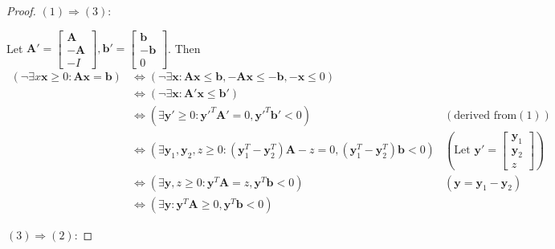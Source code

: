     \begin{proof}
        $(1)\Rightarrow(3)$:

        Let $\mathbf{A}'=\left[
        \begin{matrix}
            \mathbf{A} \\
            -\mathbf{A} \\
            -I
        \end{matrix}
        \right],
        \mathbf{b}'=\left[
        \begin{matrix}
            \mathbf{b} \\
            -\mathbf{b} \\
            0
        \end{matrix}
        \right]$.
        Then \begin{align*}
            (\neg \exists x\mathbf{x}\ge 0: \mathbf{A}\mathbf{x}= \mathbf{b})&\iff(\neg \exists \mathbf{x}: \mathbf{A}\mathbf{x}\le \mathbf{b},-\mathbf{A}\mathbf{x}\le-\mathbf{b},-\mathbf{x}\le 0)\\
                                        &\iff(\neg \exists \mathbf{x}: \mathbf{A}'\mathbf{x}\le \mathbf{b}') \\
                                        &\iff(\exists \mathbf{y}'\ge 0 :\mathbf{y}'^{T}\mathbf{A}'=0,\mathbf{y}'^{T}\mathbf{b}'<0) &(\text{derived from} (1))\\
                                        &\iff(\exists \mathbf{y}_1,\mathbf{y}_2,z\ge 0:(\mathbf{y}_{1}^{T}-\mathbf{y}_{2}^{T})\mathbf{A}-z=0,(\mathbf{y}_{1}^{T}-\mathbf{y}_{2}^{T})\mathbf{b}<0) &(\text{Let }\mathbf{y}'=\left[\begin{matrix} \mathbf{y}_1 \\\mathbf{y}_2 \\z \end{matrix}\right])\\
                                        &\iff(\exists \mathbf{y},z\ge 0:\mathbf{y}^{T}\mathbf{A}=z,\mathbf{y}^{T}\mathbf{b}<0) &(\mathbf{y}=\mathbf{y}_1-\mathbf{y}_2) \\
                                        &\iff(\exists \mathbf{y} :\mathbf{y}^{T}\mathbf{A}\ge 0,\mathbf{y}^{T}\mathbf{b}<0)
        \end{align*}

        $(3)\Rightarrow(2)$:


\end{proof}

